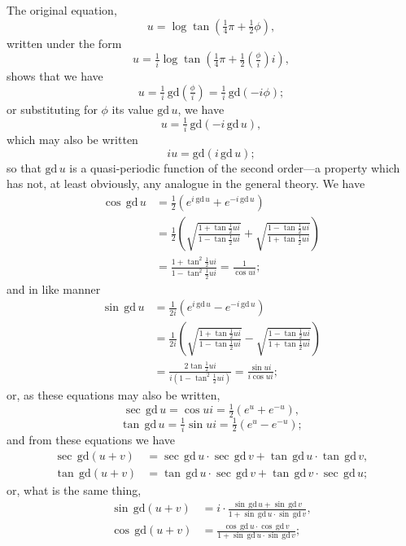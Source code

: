 \documentclass[11pt,a4paper]{article}
\theoremstyle{plain}
\begin{document}
The original equation,
\[
u = \log\tan\!\left(\tfrac{1}{4}\pi + \tfrac{1}{2}\phi\right),
\]
written under the form
\[
u = \tfrac{1}{i}\log\tan\!\left(\tfrac{1}{4}\pi + \tfrac{1}{2}\!\left(\tfrac{\phi}{i}\right)i\right),
\]
shows that we have
\[
u = \tfrac{1}{i}\,\mathrm{gd}\!\left(\tfrac{\phi}{i}\right) = \tfrac{1}{i}\,\mathrm{gd}\!\left(-i\phi\right);
\]
or substituting for $\phi$ its value $\mathrm{gd}\,u$, we have
\[
u = \tfrac{1}{i}\,\mathrm{gd}\!\left(-i\,\mathrm{gd}\,u\right),
\]
which may also be written
\[
iu = \mathrm{gd}\!\left(i\,\mathrm{gd}\,u\right);
\]
so that $\mathrm{gd}\,u$ is a quasi-periodic function of the second order---a property which has not, at least obviously, any analogue in the general theory. We have
\begin{align*}
\cos\,\mathrm{gd}\,u &= \tfrac{1}{2}(e^{i\,\mathrm{gd}\,u} + e^{-i\,\mathrm{gd}\,u}) \\
&= \tfrac{1}{2}\!\left(\sqrt{\frac{1 + \tan\tfrac{1}{2}ui}{1 - \tan\tfrac{1}{2}ui}} + \sqrt{\frac{1 - \tan\tfrac{1}{2}ui}{1 + \tan\tfrac{1}{2}ui}}\right) \\
&= \frac{1 + \tan^2\tfrac{1}{2}ui}{1 - \tan^2\tfrac{1}{2}ui} = \frac{1}{\cos ui};
\end{align*}
and in like manner
\begin{align*}
\sin\,\mathrm{gd}\,u &= \tfrac{1}{2i}(e^{i\,\mathrm{gd}\,u} - e^{-i\,\mathrm{gd}\,u}) \\
&= \tfrac{1}{2i}\!\left(\sqrt{\frac{1 + \tan\tfrac{1}{2}ui}{1 - \tan\tfrac{1}{2}ui}} - \sqrt{\frac{1 - \tan\tfrac{1}{2}ui}{1 + \tan\tfrac{1}{2}ui}}\right) \\
&= \frac{2\tan\tfrac{1}{2}ui}{i(1 - \tan^2\tfrac{1}{2}ui)} = \frac{\sin ui}{i\cos ui};
\end{align*}
or, as these equations may also be written,
\[
\sec\,\mathrm{gd}\,u = \cos ui = \tfrac{1}{2}(e^u + e^{-u}),
\]
\[
\tan\,\mathrm{gd}\,u = \tfrac{1}{i}\sin ui = \tfrac{1}{2}(e^u - e^{-u});
\]
and from these equations we have
\begin{align*}
\sec\,\mathrm{gd}(u+v) &= \sec\,\mathrm{gd}\,u \cdot \sec\,\mathrm{gd}\,v + \tan\,\mathrm{gd}\,u \cdot \tan\,\mathrm{gd}\,v, \\
\tan\,\mathrm{gd}(u+v) &= \tan\,\mathrm{gd}\,u \cdot \sec\,\mathrm{gd}\,v + \tan\,\mathrm{gd}\,v \cdot \sec\,\mathrm{gd}\,u;
\end{align*}
or, what is the same thing,
\begin{align*}
\sin\,\mathrm{gd}(u+v) &= i \cdot \frac{\sin\,\mathrm{gd}\,u + \sin\,\mathrm{gd}\,v}{1 + \sin\,\mathrm{gd}\,u \cdot \sin\,\mathrm{gd}\,v}, \\
\cos\,\mathrm{gd}(u+v) &= \frac{\cos\,\mathrm{gd}\,u \cdot \cos\,\mathrm{gd}\,v}{1 + \sin\,\mathrm{gd}\,u \cdot \sin\,\mathrm{gd}\,v};
\end{align*}
\end{document}
